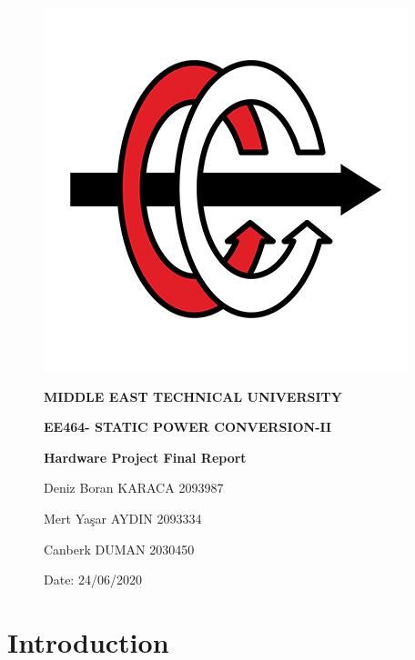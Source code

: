 \documentclass{article}
\date{}
\newcommand\tab[1][1cm]{\hspace*{#1}}
\begin{document}
\begin{figure}[H]
\vspace{-10mm}
\includegraphics[scale=0.8]{ee.png}


\vfil
\hfil \Large \bf MIDDLE EAST TECHNICAL UNIVERSITY
 \hfil
\vfil

\vspace{5mm}
\vfil
\hfil \large \bf  EE464- STATIC POWER CONVERSION-II
 \hfil
\vfil

\vspace{5mm}
\vfil
\hfil \large \bf Hardware Project Final Report\hfil
\vfil
\bf

\vspace{23mm}

Deniz Boran KARACA    2093987
\newline

Mert Yaşar AYDIN \tab2093334
\newline

Canberk DUMAN \tab 2030450


\vspace{5mm}
\small Date: 24/06/2020


\end{figure}
\newpage

\renewcommand*\contentsname{Table of Content}
\tableofcontents
\newpage
\section{Introduction}
\end{document}
